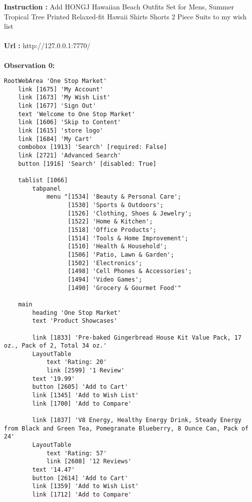 \begin{tcolorbox}[breakable]
\small
\ttfamily
{}
\textbf{Instruction :} Add HONGJ Hawaiian Beach Outfits Set for Mens, Summer Tropical Tree Printed Relaxed-fit Hawaii Shirts Shorts 2 Piece Suits to my wish list 
\\\\
\textbf{Url :} http://127.0.0.1:7770/
\\\\
\textbf{Observation 0:}
\begin{lstlisting}
RootWebArea 'One Stop Market'
    link [1675] 'My Account'
    link [1673] 'My Wish List'
    link [1677] 'Sign Out'
    text 'Welcome to One Stop Market'
    link [1606] 'Skip to Content'
    link [1615] 'store logo'
    link [1684] 'My Cart'
    combobox [1913] 'Search' [required: False]
    link [2721] 'Advanced Search'
    button [1916] 'Search' [disabled: True]

    tablist [1066]
        tabpanel
            menu "[1534] 'Beauty & Personal Care'; 
                  [1530] 'Sports & Outdoors'; 
                  [1526] 'Clothing, Shoes & Jewelry'; 
                  [1522] 'Home & Kitchen'; 
                  [1518] 'Office Products'; 
                  [1514] 'Tools & Home Improvement'; 
                  [1510] 'Health & Household'; 
                  [1506] 'Patio, Lawn & Garden'; 
                  [1502] 'Electronics'; 
                  [1498] 'Cell Phones & Accessories'; 
                  [1494] 'Video Games'; 
                  [1490] 'Grocery & Gourmet Food'"

    main
        heading 'One Stop Market'
        text 'Product Showcases'

        link [1833] 'Pre-baked Gingerbread House Kit Value Pack, 17 oz., Pack of 2, Total 34 oz.'
        LayoutTable
            text 'Rating: 20'
            link [2599] '1 Review'
        text '19.99'
        button [2605] 'Add to Cart'
        link [1345] 'Add to Wish List'
        link [1700] 'Add to Compare'

        link [1837] 'V8 Energy, Healthy Energy Drink, Steady Energy from Black and Green Tea, Pomegranate Blueberry, 8 Ounce Can, Pack of 24'
        LayoutTable
            text 'Rating: 57'
            link [2608] '12 Reviews'
        text '14.47'
        button [2614] 'Add to Cart'
        link [1359] 'Add to Wish List'
        link [1712] 'Add to Compare'


\end{lstlisting}
\end{tcolorbox}
